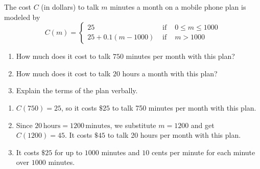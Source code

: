 {\label{piecewisemobile} The cost $C$ (in dollars) to talk $m$ minutes a month on a mobile phone plan is modeled by   \[{\displaystyle C(m) = \left\{ \begin{array}{rcl} 25 & \mbox{ if } & 0 \leq m \leq 1000 \\
                                                            25+0.1(m-1000) & \mbox{ if } & m > 1000
                                     \end{array} \right. }\]
                                     
\begin{enumerate}

\item  How much does it cost to talk $750$ minutes per month with this plan?  %

\item  How much does it cost to talk $20$ hours a month with this plan?  %

\item  Explain the terms of the plan verbally.  %
 
\end{enumerate}}
{\begin{enumerate}

\item  $C(750) = 25$, so it costs $\$ 25$ to talk 750 minutes per month with this plan.

\item  Since $20 \, \text{hours} = 1200 \, \text{minutes}$, we substitute $m = 1200$ and get  $C(1200) = 45$.  It costs $\$ 45$ to talk 20 hours per month with this plan. 

\item It costs $\$25$ for up to $1000$ minutes and $10$ cents per minute for each minute over $1000$ minutes.
 
\end{enumerate}
}